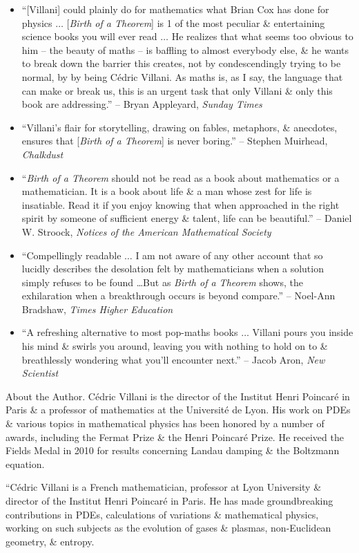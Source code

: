 \documentclass{article}
\begin{document}
\begin{enumerate}
\begin{itemize}
		\item ``[{\sc Villani}] could plainly do for mathematics what {\sc Brian Cox} has done for physics $\ldots$ [{\it Birth of a Theorem}] is 1 of the most peculiar \& entertaining science books you will ever read $\ldots$ He realizes that what seems too obvious to him -- the beauty of maths -- is baffling to almost everybody else, \& he wants to break down the barrier this creates, not by condescendingly trying to be normal, by by being {\sc C\'edric Villani}. As maths is, as I say, the language that can make or break us, this is an urgent task that only {\sc Villani} \& only this book are addressing.'' -- {\sc Bryan Appleyard}, {\it Sunday Times}
		\item ``{\sc Villani}'s flair for storytelling, drawing on fables, metaphors, \& anecdotes, ensures that [{\it Birth of a Theorem}] is never boring.'' -- {\sc Stephen Muirhead}, {\it Chalkdust}
		\item ``{\it Birth of a Theorem} should not be read as a book about mathematics or a mathematician. It is a book about life \& a man whose zest for life is insatiable. Read it if you enjoy knowing that when approached in the right spirit by someone of sufficient energy \& talent, life can be beautiful.'' -- {\sc Daniel W. Stroock}, {\it Notices of the American Mathematical Society}
		\item ``Compellingly readable $\ldots$ I am not aware of any other account that so lucidly describes the desolation felt by mathematicians when a solution simply refuses to be found \ldots But as {\it Birth of a Theorem} shows, the exhilaration when a breakthrough occurs is beyond compare.'' -- {\sc Noel-Ann Bradshaw}, {\it Times Higher Education}
		\item ``A refreshing alternative to most pop-maths books $\ldots$ {\sc Villani} pours you inside his mind \& swirls you around, leaving you with nothing to hold on to \& breathlessly wondering what you'll encounter next.'' -- {\sc Jacob Aron}, {\it New Scientist}
	\end{itemize}
	{\sf About the Author.} {\sc C\'edric Villani} is the director of the Institut Henri Poincaré in Paris \& a professor of mathematics at the Université de Lyon. His work on PDEs \& various topics in mathematical physics has been honored by a number of awards, including the Fermat Prize \& the Henri Poincar\'e Prize. He received the Fields Medal in 2010 for results concerning Landau damping \& the Boltzmann equation.

	``{\sc C\'edric Villani} is a French mathematician, professor at Lyon University \& director of the Institut Henri Poincaré in Paris. He has made groundbreaking contributions in PDEs, calculations of variations \& mathematical physics, working on such subjects as the evolution of gases \& plasmas, non-Euclidean geometry, \& entropy.


\end{enumerate}
\end{document}
